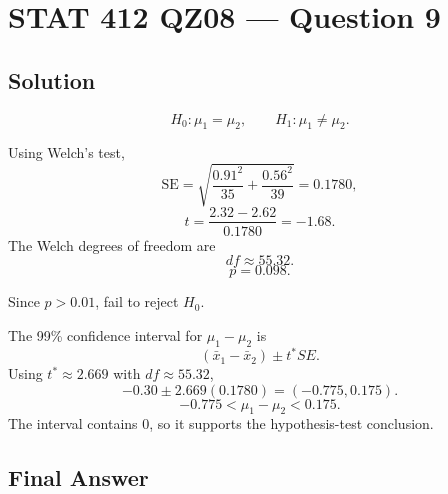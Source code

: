 \documentclass[11pt]{article}
\begin{document}
\section*{STAT 412 QZ08 --- Question 9}

\subsection*{Solution}

\[
H_0:\mu_1=\mu_2,\qquad H_1:\mu_1\ne\mu_2.
\]

Using Welch's test,
\[
\text{SE}=\sqrt{\frac{0.91^2}{35}+\frac{0.56^2}{39}}=0.1780,
\]
\[
t=\frac{2.32-2.62}{0.1780}=-1.68.
\]
The Welch degrees of freedom are
\[
df\approx55.32.
\]
\[
p=0.098.
\]

Since \(p>0.01\), fail to reject \(H_0\).

The 99\% confidence interval for \(\mu_1-\mu_2\) is
\[
(\bar{x}_1-\bar{x}_2)\pm t^*SE.
\]
Using \(t^*\approx2.669\) with \(df\approx55.32\),
\[
-0.30\pm 2.669(0.1780)=(-0.775,0.175).
\]
\[
-0.775<\mu_1-\mu_2<0.175.
\]
The interval contains 0, so it supports the hypothesis-test conclusion.

\subsection*{Final Answer}

\end{document}
